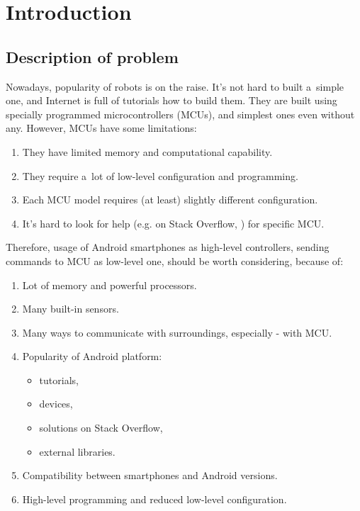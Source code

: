 \chapter{Introduction}

\section{Description of problem}
Nowadays, popularity of robots is on the raise. 
It's not hard to built a~simple one, and Internet is full of tutorials how to
build them.
They are built using specially programmed microcontrollers (MCUs), and simplest
ones even without any.
However, MCUs have some limitations:
\begin{enumerate}
  \item They have limited memory and computational capability.
  \item They require a~lot of low-level configuration and programming.
  \item Each MCU model requires (at least) slightly different configuration.
  \item It's hard to look for help (e.g. on Stack Overflow,
  \cite{stack_overflow}) for specific MCU.
\end{enumerate}
Therefore, usage of Android smartphones as high-level controllers, sending
commands to MCU as low-level one, should be worth considering, because of:
\begin{enumerate}
  \item Lot of memory and powerful processors.
  \item Many built-in sensors.
  \item Many ways to communicate with surroundings, especially -
  with MCU.
  \item Popularity of Android platform:
  	\begin{itemize}
  	  \item tutorials,
  	  \item devices,
  	  \item solutions on Stack Overflow,
  	  \item external libraries.
  	\end{itemize}
  \item Compatibility between smartphones and Android versions.
  \item High-level programming and reduced low-level configuration.
\end{enumerate}

